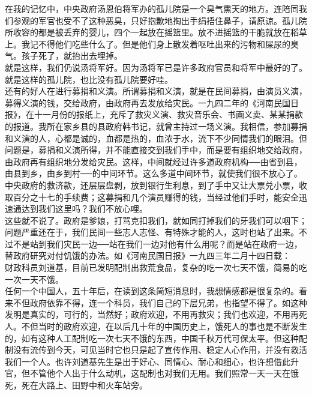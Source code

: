 在我的记忆中，中央政府汤恩伯将军办的孤儿院是一个臭气熏天的地方。连陪同我们参观的军官也受不了这种恶臭，只好抱歉地掏出手绢捂住鼻子，请原谅。孤儿院所收容的都是被丢弃的婴儿，四个一起放在摇篮里。放不进摇篮的干脆就放在稻草上。我记不得他们吃些什么了。但是他们身上散发着呕吐出来的污物和屎尿的臭气。孩子死了，就抬出去埋掉。\\

就是这样，我们仍说汤将军好。因为汤将军已是许多政府官员和将军中最好的了。就是这样的孤儿院，也比没有孤儿院要好哇。\\

还有的好人在进行募捐和义演。所谓募捐和义演，就是在民间募捐，由演员义演，募得义演的钱，交给政府，由政府再去发放给灾民。一九四二年的《河南民国日报》，在十一月份的报纸上，充斥了救灾义演、救灾音乐会、书画义卖、某某捐款的报道。我所在家乡县的县政府韩书记，就曾主持过一场义演。我相信，参加募捐和义演的人，心都是诚的，血都是热的，血浓于水，流下不少同情我们的眼泪。但问题是，募捐和义演所得，并不能直接交到我们手中，而是要有组织地交给政府，由政府再有组织地分发给灾民。这样，中间就经过许多道政府机构{\Add ──}由省到县，由县到乡，由乡到村{\Add ──}的中间环节。这么多道中间环节，就使我们很不放心了。中央政府的救济款，还层层盘剥，放到银行生利息，到了手中又让大票兑小票，收取百分之十七的手续费；这募捐和几个演员赚得的钱，当经过他们手时，能安全迅速通达到我们这里吗？我们不放心哩。\\

这些就不说了。政府是爹娘，打骂克扣我们，就如同打掉我们的牙我们可以咽下；问题严重还在于，我们民间一些志人志怪、有特殊才能的人，这时也站了出来。不过不是站到我们灾民一边{\Add ──}站在我们一边对他有什么用呢？而是站在政府一边，替政府研究对付饥饿的办法。如《河南民国日报》一九四三年二月十四日载：\\

财政科员刘道基，目前已发明配制出救荒食品，复杂的吃一次七天不饿，简易的吃一次一天不饿。\\

任何一个中国人，五十年后，在读到这条简短消息时，我想情感都是很复杂的。看来不但政府依靠不得，连一个科员，我们自己的下层兄弟，也指望不得了。如这种发明是真实的，可行的，当然好；政府欢迎，不用再救灾；我们也欢迎，不用再死人。不但当时的政府欢迎，在以后几十年的中国历史上，饿死人的事也是不断发生的，如有这种人工配制吃一次七天不饿的东西，中国千秋万代可保太平。但这种配制没有流传到今天，可见当时它也只是起了宣传作用、稳定人心作用，并没有救活我们一个人。也许刘道基先生是出于好心、同情心、耐心和细心，也许想借此升官，但不管他个人出于什么动机，这配制也对我们无用。我们照常一天一天在饿死，死在大路上、田野中和火车站旁。\\

